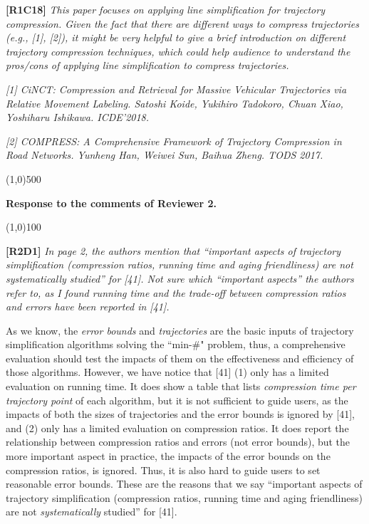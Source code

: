 \documentclass{letter}
\begin{document}
\textbf{[R1C18]} \emph{ This paper focuses on applying line simplification for trajectory compression. Given the fact that there are different ways to compress trajectories (e.g., [1], [2]), it might be very helpful to give a brief introduction on different trajectory compression techniques, which could help audience to understand the pros/cons of applying line simplification to compress trajectories. }

\emph{ [1] CiNCT: Compression and Retrieval for Massive Vehicular Trajectories via Relative Movement Labeling. Satoshi Koide, Yukihiro Tadokoro, Chuan Xiao, Yoshiharu Ishikawa. ICDE'2018.}

\emph{ [2] COMPRESS: A Comprehensive Framework of Trajectory Compression in Road Networks. Yunheng Han, Weiwei Sun, Baihua Zheng. TODS 2017.}


\line(1,0){500}

\textbf{Response to the comments of Reviewer 2.}

\line(1,0){100}

\textbf{[R2D1]} \emph{In page 2, the authors mention that “important aspects of trajectory simplification (compression ratios, running time and aging friendliness) are not systematically studied” for [41]. Not sure which “important aspects” the authors refer to, as I found running time and the trade-off between compression ratios and errors have been reported in [41].}

As we know, the \emph{error bounds} and \emph{trajectories} are the basic inputs of trajectory simplification algorithms solving the ``min-\#" problem, thus, a comprehensive evaluation should test the impacts of them on the effectiveness and efficiency of those algorithms.  
%
However, we have notice that [41] (1) only has a limited evaluation on running time. It does show a table that lists \emph{compression time per trajectory point} of each algorithm, but it is not sufficient to guide users, as the impacts of both the sizes of trajectories and the error bounds is ignored by [41], and (2) only has a limited evaluation on compression ratios. It does report the relationship between compression ratios and errors (not error bounds),  but the more important aspect in practice, the impacts of the error bounds on the compression ratios, is ignored. Thus, it is also hard to guide users to set reasonable error bounds.
%
These are the reasons that we say ``important aspects of trajectory simplification (compression ratios, running time and aging friendliness) are not \emph{systematically} studied” for [41]. 
\end{document}
